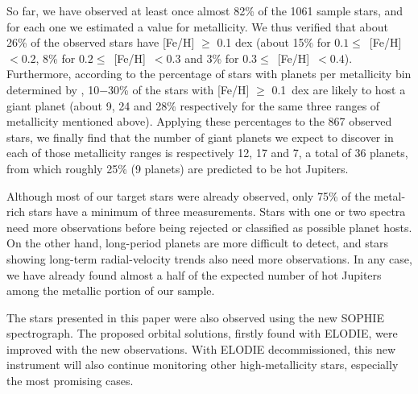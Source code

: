 \documentclass{aa}
\begin{document}
So far, we have observed at least once almost 82\% of the 1061 sample stars,
and for each one we estimated a value for metallicity. We thus verified that
about 26\% of the observed stars have [Fe/H] $\ge$ 0.1 dex (about 15\% for
$0.1\le$~[Fe/H]~$<0.2$, 8\% for $0.2\le$~[Fe/H]~$<0.3$ and 3\% for
$0.3\le$~[Fe/H]~$<0.4$). Furthermore, according to the percentage of stars
with planets per metallicity bin determined by \citet{Santosetal2004},
10$-$30\% of the stars with [Fe/H] $\ge$ 0.1~dex are likely to host a giant
planet (about 9, 24 and 28\% respectively for the same three ranges of
metallicity mentioned above). Applying these percentages to the 867 observed
stars, we finally find that the number of giant planets we expect to
discover in each of those metallicity ranges is respectively 12, 17 and 7, a
total of
36 planets, from which roughly 25\% (9 planets) are predicted to be hot
Jupiters.

Although most of our target stars were already observed, only 75\% of the
metal-rich stars have a minimum of three measurements. Stars with one or two
spectra need more observations before being rejected or classified as
possible planet hosts. On the other hand, long-period planets are more
difficult to detect, and stars showing long-term radial-velocity trends
also need more observations. In any case, we have already found almost a
half of the expected number of hot Jupiters among the metallic portion of
our sample.

The stars presented in this paper were also observed using the new SOPHIE
spectrograph. The proposed orbital solutions, firstly found with ELODIE,
were improved with the new observations. With ELODIE decommissioned, this
new instrument will also continue monitoring other high-metallicity stars,
especially the most promising cases.
\end{document}
